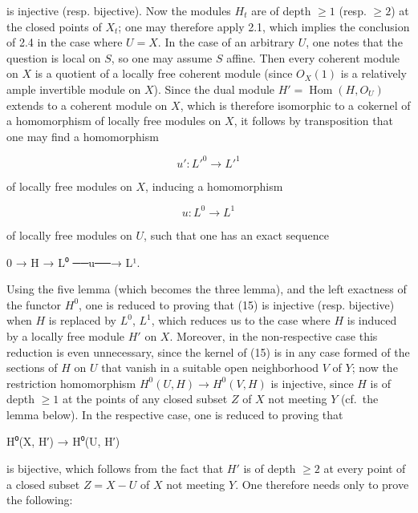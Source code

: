 \documentclass[
  11pt,
  a4paper,
]{book}
\newenvironment{Shaded}{}{}
\newcommand{\NormalTok}[1]{#1}
\begin{document}
is injective (resp. bijective). Now the modules \(H_{t}\) are of depth
\(\geqslant 1\) (resp. \(\geqslant 2\)) at the closed points of
\(X_{t}\); one may therefore apply 2.1, which implies the conclusion of
2.4 in the case where \(U = X\). In the case of an arbitrary \(U\), one
notes that the question is local on \(S\), so one may assume \(S\)
affine. Then every coherent module on \(X\) is a quotient of a locally
free coherent module (since \(O_{X}(1)\) is a relatively ample
invertible module on \(X\)). Since the dual module
\(H' = \operatorname{Hom}(H, O_{U})\) extends to a coherent module on
\(X\), which is therefore isomorphic to a cokernel of a homomorphism of
locally free modules on \(X\), it follows by transposition that one may
find a homomorphism

\[ u': L'^{0} \to L'^{1} \]

of locally free modules on \(X\), inducing a homomorphism

\[ u: L^{0} \to L^{1} \]

of locally free modules on \(U\), such that one has an exact sequence

\begin{Shaded}
\begin{Highlighting}[]
\NormalTok{0 → H → L⁰ ──u──→ L¹.}
\end{Highlighting}
\end{Shaded}

Using the five lemma (which becomes the three lemma), and the left
exactness of the functor \(H^{0}\), one is reduced to proving that (15)
is injective (resp. bijective) when \(H\) is replaced by \(L^{0}\),
\(L^{1}\), which reduces us to the case where \(H\) is induced by a
locally free module \(H'\) on \(X\). Moreover, in the non-respective
case this reduction is even unnecessary, since the kernel of (15) is in
any case formed of the sections of \(H\) on \(U\) that vanish in a
suitable open neighborhood \(V\) of \(Y\); now the restriction
homomorphism \(H^{0}(U, H) \to H^{0}(V, H)\) is injective, since \(H\)
is of depth \(\geqslant 1\) at the points of any closed subset \(Z\) of
\(X\) not meeting \(Y\) (cf.~the lemma below). In the respective case,
one is reduced to proving that

\begin{Shaded}
\begin{Highlighting}[]
\NormalTok{H⁰(X, H′) → H⁰(U, H′)}
\end{Highlighting}
\end{Shaded}

is bijective, which follows from the fact that \(H'\) is of depth
\(\geqslant 2\) at every point of a closed subset \(Z = X -
U\) of \(X\) not meeting \(Y\). One therefore needs only to prove the
following:
\end{document}
